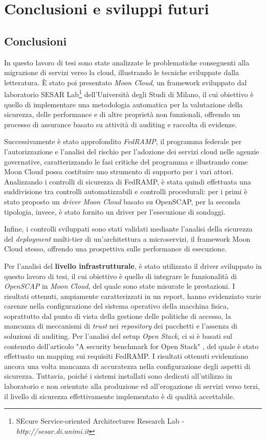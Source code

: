 \documentclass[../main.tex]{subfiles}
\begin{document}
\chapter{Conclusioni e sviluppi futuri}
\section {Conclusioni}
In questo lavoro di tesi sono state analizzate le problematiche conseguenti alla migrazione di servizi verso la cloud, illustrando le tecniche sviluppate dalla letteratura.
È stato poi presentato \textit{Moon Cloud}, un framework sviluppato dal laboratorio SESAR Lab\footnote{SEcure Service-oriented Architectures Research Lab - \textit{http://sesar.di.unimi.it}} dell'Università degli Studi di Milano, il cui obiettivo è quello di implementare una metodologia automatica per la valutazione della sicurezza, delle performance e di altre proprietà non funzionali, offrendo un processo di assurance basato su attività di auditing e raccolta di evidenze.

Successivamente è stato approfondito \textit{FedRAMP}, il programma federale per l'autorizzazione e l'analisi del rischio per l'adozione dei servizi cloud nelle agenzie governative, caratterizzando le fasi critiche del programma e illustrando come Moon Cloud possa costituire uno strumento di supporto per i vari attori.
Analizzando i controlli di sicurezza di FedRAMP, è stata quindi effettuata una suddivisione tra controlli automatizzabili e controlli procedurali: per i primi è stato proposto un \textit{driver} \textit{Moon Cloud} basato su OpenSCAP, per la seconda tipologia, invece, è stato fornito un driver per l'esecuzione di sondaggi.

Infine, i controlli sviluppati sono stati validati mediante l'analisi della sicurezza del \textit{deployment} multi-tier di un'architettura a microservizi, il framework Moon Cloud stesso, offrendo una prospettiva sulle performance di esecuzione.

Per l'analisi del \textbf{livello infrastrutturale}, è stato utilizzato il driver sviluppato in questo lavoro di tesi, il cui obiettivo è quello di integrare le funzionalità di \textit{OpenSCAP} in \textit{Moon Cloud}, del quale sono state misurate le prestazioni. I risultati ottenuti, ampiamente caratterizzati in un report, hanno evidenziato varie carenze nella configurazione del sistema operativo della macchina fisica, soprattutto dal punto di vista della gestione delle politiche di accesso, la mancanza di meccanismi di \textit{trust} nei \textit{repository} dei pacchetti e l'assenza di soluzioni di auditing.
Per l'analisi del setup \textit{Open Stack}, ci si è basati sul contenuto dell'articolo "A security benchmark for Open Stack" \cite{MyPaper}, del quale è stato effettuato un mapping sui requisiti FedRAMP. I risultati ottenuti evidenziano ancora una volta mancanza di accuratezza nella configurazione degli aspetti di sicurezza. Tuttavia, poiché i sistemi installati sono dedicati all'utilizzo in laboratorio e non orientate alla produzione ed all'erogazione di servizi verso terzi, il livello di sicurezza effettivamente implementato è di qualità accettabile.
\end{document}
